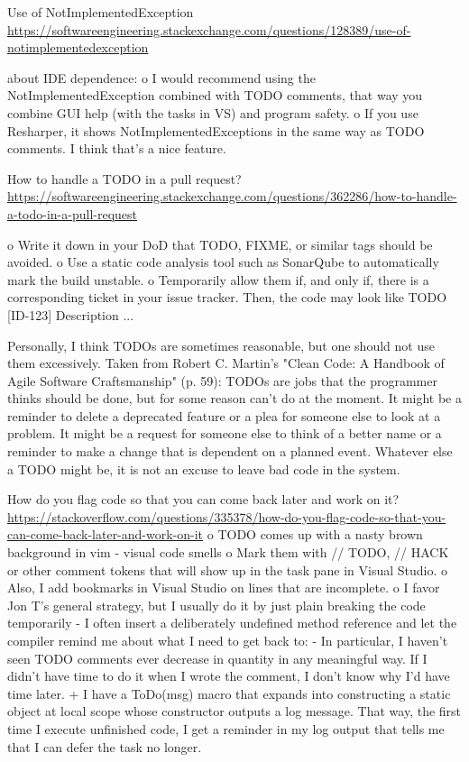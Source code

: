 Use of NotImplementedException \url{https://softwareengineering.stackexchange.com/questions/128389/use-of-notimplementedexception}

about IDE dependence:
o I would recommend using the NotImplementedException combined with TODO comments, that way you combine GUI help (with the tasks in VS) and program safety.
o If you use Resharper, it shows NotImplementedExceptions in the same way as TODO comments. I think that's a nice feature.

How to handle a TODO in a pull request? \url{https://softwareengineering.stackexchange.com/questions/362286/how-to-handle-a-todo-in-a-pull-request}

o Write it down in your DoD that TODO, FIXME, or similar tags should be avoided.
o Use a static code analysis tool such as SonarQube to automatically mark the build unstable.
o Temporarily allow them if, and only if, there is a corresponding ticket in your issue tracker. Then, the code may look like TODO [ID-123] Description ...

Personally, I think TODOs are sometimes reasonable, but one should not use them excessively. Taken from Robert C. Martin's "Clean Code: A Handbook of Agile Software Craftsmanship" (p. 59):
TODOs are jobs that the programmer thinks should be done, but for some reason can't do at the moment. It might be a reminder to delete a deprecated feature or a plea for someone else to look at a problem. It might be a request for someone else to think of a better name or a reminder to make a change that is dependent on a planned event. Whatever else a TODO might be, it is not an excuse to leave bad code in the system.

How do you flag code so that you can come back later and work on it? \url{https://stackoverflow.com/questions/335378/how-do-you-flag-code-so-that-you-can-come-back-later-and-work-on-it}
o TODO comes up with a nasty brown background in vim - visual code smells
o Mark them with // TODO, // HACK or other comment tokens that will show up in the task pane in Visual Studio.
o Also, I add bookmarks in Visual Studio on lines that are incomplete.
o I favor Jon T's general strategy, but I usually do it by just plain breaking the code temporarily - I often insert a deliberately undefined method reference and let the compiler remind me about what I need to get back to:
- In particular, I haven't seen TODO comments ever decrease in quantity in any meaningful way. If I didn't have time to do it when I wrote the comment, I don't know why I'd have time later.
+ I have a ToDo(msg) macro that expands into constructing a static object at local scope whose constructor outputs a log message. That way, the first time I execute unfinished code, I get a reminder in my log output that tells me that I can defer the task no longer.


